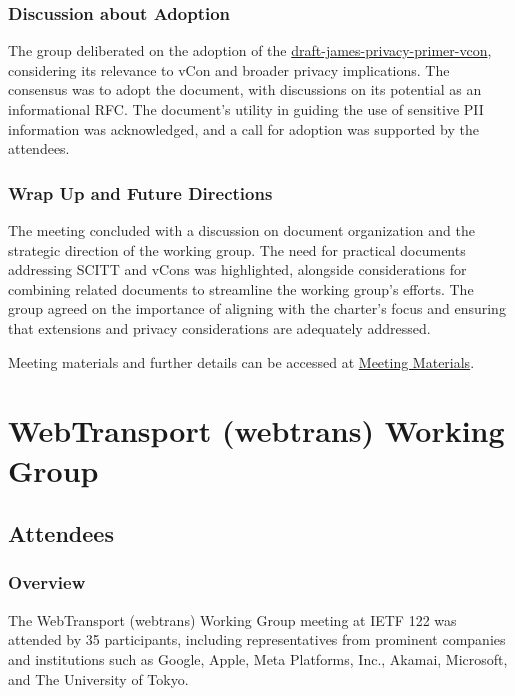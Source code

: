 \documentclass{article}
\begin{document}
\subsubsection{Discussion about Adoption}
The group deliberated on the adoption of the \href{https://datatracker.ietf.org/doc/draft-james-privacy-primer-vcon/}{draft-james-privacy-primer-vcon}, considering its relevance to vCon and broader privacy implications. The consensus was to adopt the document, with discussions on its potential as an informational RFC. The document's utility in guiding the use of sensitive PII information was acknowledged, and a call for adoption was supported by the attendees.

\subsubsection{Wrap Up and Future Directions}
The meeting concluded with a discussion on document organization and the strategic direction of the working group. The need for practical documents addressing SCITT and vCons was highlighted, alongside considerations for combining related documents to streamline the working group's efforts. The group agreed on the importance of aligning with the charter's focus and ensuring that extensions and privacy considerations are adequately addressed.

Meeting materials and further details can be accessed at \href{https://datatracker.ietf.org/meeting/122/materials/agenda-122-vcon}{Meeting Materials}.




\newpage

\section{WebTransport (webtrans) Working Group}

\subsection{Attendees}
\subsubsection{Overview}
The WebTransport (webtrans) Working Group meeting at IETF 122 was attended by 35 participants, including representatives from prominent companies and institutions such as Google, Apple, Meta Platforms, Inc., Akamai, Microsoft, and The University of Tokyo.
\end{document}
